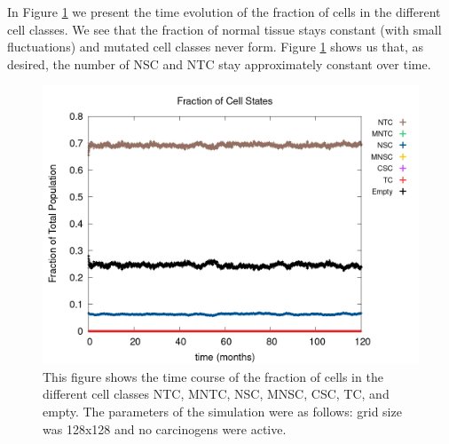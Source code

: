 \documentclass[\main/thesis.tex]{subfiles}
\begin{document}
In Figure \ref{fig:EquilibriumNumState} we present the time evolution of the fraction of cells in the different cell classes. We see that the fraction of normal tissue stays constant (with small fluctuations) and mutated cell classes never form. Figure \ref{fig:EquilibriumNumState} shows us that, as desired, the number of NSC and NTC stay approximately constant over time. 
\begin{figure}[H]
    \centering
    \includegraphics[width=\textwidth]{images/1_Equilibrium/Fig1/numState_all.png}
    \caption{This figure shows the time course of the fraction of cells in the different cell classes NTC, MNTC, NSC, MNSC, CSC, TC, and empty. The parameters of the simulation were as follows: grid size was 128x128 and no carcinogens were active.}
    \label{fig:EquilibriumNumState}
\end{figure}
\end{document}

